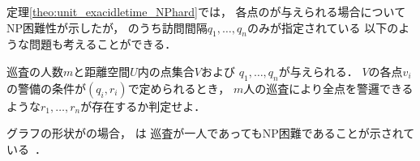 定理\ref{theo:unit_exacidletime_NPhard}では，
各点の{\exactIdletime}が与えられる場合についてNP困難性が示したが，
{\exactIdletime}のうち訪問間隔$q_1, \ldots, q_n$のみが指定されている
以下のような問題も考えることができる．

\begin{intervalSpecifiedPatrollingProblemDecision}
巡査の人数$m$と距離空間$U$内の点集合$V$および
$q_1, \ldots, q_n$が与えられる．
$V$の各点$v_i$の警備の条件が{\exactIdletime}$(q_i, r_i)$で定められるとき，
$m$人の巡査により全点を警邏できるような$r_1, \ldots, r_n$が存在するか判定せよ．
\end{intervalSpecifiedPatrollingProblemDecision}

グラフの形状が{\graphUnit}の場合，
{\intervalSpecifiedPatProbDecision}は
巡査が一人であってもNP困難であることが示されている~\cite{kawamura2015simple}．




